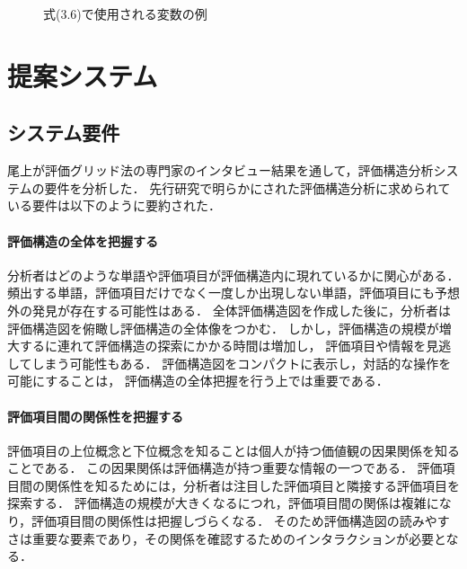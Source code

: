 \documentclass[syuuron]{kuee}
\begin{document}
		\begin{figure}
			\begin{center}
			\end{center}
			\caption{式(3.6)で使用される変数の例}
	  		\label{fig:met3}
		\end{figure}

\chapter{提案システム}
	\section{システム要件}
		尾上が評価グリッド法の専門家のインタビュー結果を通して，評価構造分析システムの要件を分析した\cite{hak1}．
		先行研究で明らかにされた評価構造分析に求められている要件は以下のように要約された．
		\subsubsection{評価構造の全体を把握する}
			分析者はどのような単語や評価項目が評価構造内に現れているかに関心がある．
			頻出する単語，評価項目だけでなく一度しか出現しない単語，評価項目にも予想外の発見が存在する可能性はある．
			全体評価構造図を作成した後に，分析者は評価構造図を俯瞰し評価構造の全体像をつかむ．
			しかし，評価構造の規模が増大するに連れて評価構造の探索にかかる時間は増加し，
			評価項目や情報を見逃してしまう可能性もある．
			評価構造図をコンパクトに表示し，対話的な操作を可能にすることは，
			評価構造の全体把握を行う上では重要である．
		\subsubsection{評価項目間の関係性を把握する}
			評価項目の上位概念と下位概念を知ることは個人が持つ価値観の因果関係を知ることである．
			この因果関係は評価構造が持つ重要な情報の一つである．
			評価項目間の関係性を知るためには，分析者は注目した評価項目と隣接する評価項目を探索する．
			評価構造の規模が大きくなるにつれ，評価項目間の関係は複雑になり，評価項目間の関係性は把握しづらくなる．
			そのため評価構造図の読みやすさは重要な要素であり，その関係を確認するためのインタラクションが必要となる．
\end{document}
